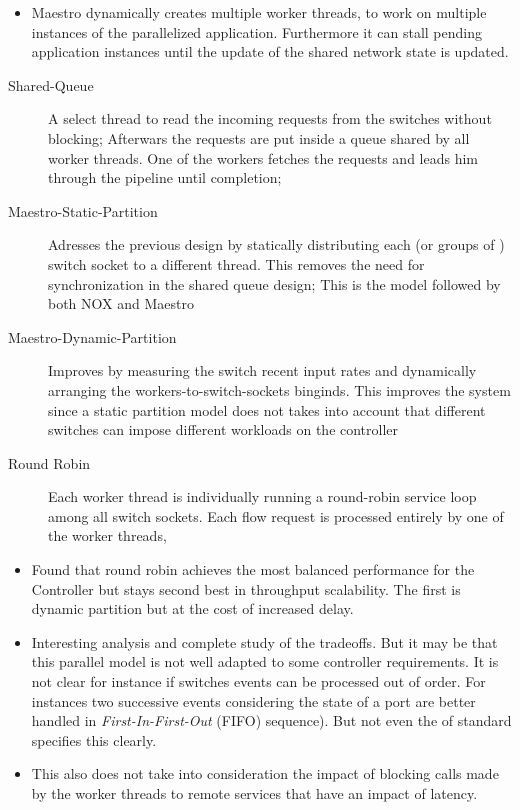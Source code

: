 \documentclass[12pt,openright,twoside]{report}
\begin{document}
\begin{itemize}
\begin{itemize}
\item Maestro dynamically creates multiple worker threads, to work on multiple instances of the parallelized application. Furthermore it can stall pending application instances until the update of the shared network state is updated. 
\end{itemize}

\begin{description}
\item[Shared-Queue] A select thread to read the incoming requests from the switches without blocking; Afterwars the requests are put inside a queue shared by all worker threads. One of the workers fetches the requests and leads him through the pipeline until completion;
\item[Maestro-Static-Partition] Adresses the previous design by statically distributing each (or groups of ) switch socket to a different thread. This removes the need for synchronization in the shared queue design; This is the model followed by both NOX and Maestro 
\item[Maestro-Dynamic-Partition] Improves by measuring the switch recent input rates and dynamically arranging the workers-to-switch-sockets binginds. This improves the system since a static partition model does not takes into account that different switches can impose different workloads on the controller 
\item[Round Robin ] Each worker thread is individually running a round-robin service loop among all switch sockets. Each flow request is processed entirely by one of the worker threads, 
\end{description}

\begin{itemize}
\item Found that round robin achieves the most balanced performance for the Controller but stays second best in throughput scalability. The first is dynamic partition but at the cost of increased delay. 
\item Interesting analysis and complete study of the tradeoffs. But it may be that this parallel model is not well adapted to some controller requirements. It is not clear for instance if switches events can be processed out of order. For instances two successive events considering the state of a port are better handled in \emph{First-In-First-Out} (FIFO) sequence). But not even the \gls{of} standard specifies this clearly. 
\item This also does not take into consideration the impact of blocking calls made by the worker threads to remote services that have an impact of latency. 
\end{itemize}


\end{itemize}
\end{document}
